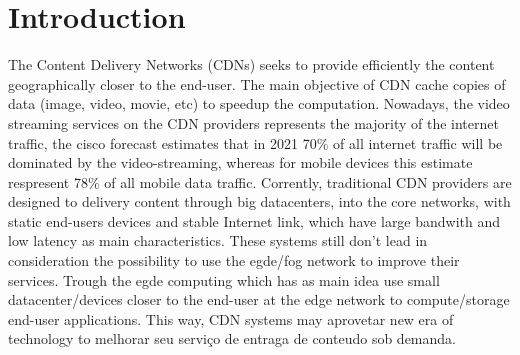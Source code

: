 
\section{Introduction}
\label{sec:intro}


The Content Delivery Networks (CDNs) seeks to provide efficiently the content geographically closer to the end-user. The main objective of CDN cache copies of data (image, video, movie, etc) to speedup the computation. Nowadays, the video streaming services on the CDN providers represents the majority of the internet traffic, the cisco forecast \cite{Ma:WWW13} estimates that in 2021 70\% of all internet traffic will be dominated by the video-streaming, whereas for mobile devices this estimate respresent 78\% of all mobile data traffic. Corrently, traditional CDN providers are designed to delivery content through big datacenters, into the core networks, with static end-users devices and stable Internet link, which have large bandwith and low latency as main characteristics. These systems still don't lead in consideration the possibility to use the egde/fog network to improve their services. Trough the egde computing which has as main idea use small datacenter/devices closer to the end-user at the edge network to compute/storage end-user applications. This way, CDN systems may aprovetar new era of technology to melhorar seu serviço de entraga de conteudo sob demanda.

